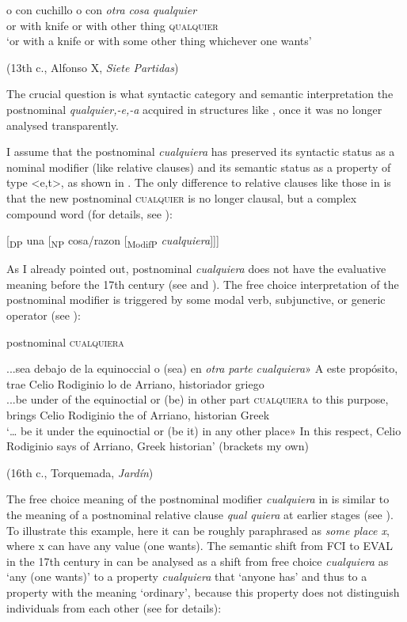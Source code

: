\ea \label{ex:key:321} %
    \gll o con cuchillo o con \textit{otra} \textit{cosa} \textit{qualquier}\\
or with knife or with other thing \textsc{qualquier}\\
    \glt ‘or with a knife or with some other thing whichever one wants’

    (13th c., Alfonso X, \textit{Siete Partidas})
\z

The crucial question is what syntactic category and semantic interpretation the postnominal \textit{qualquier,-e,-a} acquired in structures like , once it was no longer analysed transparently.

I assume that the postnominal \textit{cualquiera} has preserved its syntactic status as a nominal modifier (like relative clauses) and its semantic status as a property of type <e,t>, as shown in . The only difference to relative clauses like those in  is that the new postnominal \textsc{cualquier} is no longer clausal, but a complex compound word (for details, see ):

\ea{} \label{ex:key:322}
  [\textsubscript{DP} una [\textsubscript{NP} cosa/razon [\textsubscript{ModifP} \textit{cualquiera}]]]

\z

As I already pointed out, postnominal \textit{cualquiera} does not have the evaluative meaning before the 17th century (see  and ). The free choice interpretation of the postnominal modifier is triggered by some modal verb, subjunctive, or generic operator (see ):

\newpage
\ea \label{ex:key:323}
  postnominal \textsc{cualquiera}

  \gll ...sea debajo de la equinoccial o (sea) en \textit{otra} \textit{parte} \textit{cualquiera}» A este propósito, trae Celio Rodiginio lo de Arriano, historiador griego\\
...be under of the equinoctial or (be) in other part \textsc{cualquiera} to this purpose, brings Celio Rodiginio the of Arriano, historian Greek\\
  \glt ‘… be it under the equinoctial or (be it) in any other place» In this respect, Celio Rodiginio says of Arriano, Greek historian’ (brackets my own)

  (16th c., Torquemada, \textit{Jardín})
\z

The free choice meaning of the postnominal modifier \textit{cualquiera} in  is similar to the meaning of a postnominal relative clause \textit{qual quiera} at earlier stages (see ). To illustrate this example, here it can be roughly paraphrased as \textit{some place x}, where x can have any value (one wants). The semantic shift from FCI to EVAL in the 17th century in  can be analysed as a shift from free choice \textit{cualquiera} as ‘any (one wants)’ to a property \textit{cualquiera} that ‘anyone has’ and thus to a property with the meaning ‘ordinary’, because this property does not distinguish individuals from each other (see  for details):

